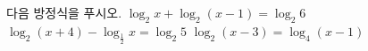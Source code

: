 다음 방정식을 푸시오.
 $\log_2 x+\log_2 (x-1)=\log_2 6$
 $\log_2 (x+4)-\log_{\frac{1}{2}} x=\log_2 5$
 $\log_2 (x-3)=\log_4 (x-1)$
